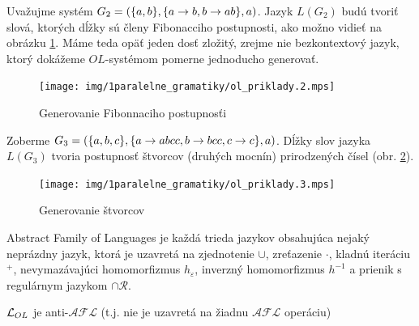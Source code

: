 \begin{priklad}
    Uvažujme systém $G_{2}=(\{a,b\},\{ a \rightarrow b, b \rightarrow ab \},a)$.
    Jazyk $L(G_{2})$ budú
    tvoriť slová, ktorých dĺžky sú členy Fibonacciho postupnosti, ako
    možno vidieť na obrázku \ref{img:ol_priklad_2}. Máme teda
    opäť jeden dosť zložitý, zrejme nie bezkontextový jazyk,
    ktorý dokážeme $OL$-systémom pomerne jednoducho generovať.
    \begin{figure}[htp]
        \centering
        \texttt{[image: img/1paralelne\_gramatiky/ol\_priklady.2.mps]}
        \caption{Generovanie Fibonnaciho postupnosťi}
        \label{img:ol_priklad_2}
    \end{figure}
\end{priklad}


\begin{priklad}
    Zoberme $G_3=(\{a,b,c\},\{a \rightarrow abcc,b \rightarrow bcc,
        c \rightarrow c\},a)$. Dĺžky
    slov jazyka $L(G_3)$ tvoria postupnosť štvorcov (druhých mocnín)
    prirodzených čísel (obr. \ref{img:ol_priklad_3}).

    \begin{figure}[htp]
        \centering
        \texttt{[image: img/1paralelne\_gramatiky/ol\_priklady.3.mps]}
        \caption{Generovanie štvorcov}
        \label{img:ol_priklad_3}
    \end{figure}
\end{priklad}


\begin{definicia}
    Abstract Family of Languages je každá trieda
    jazykov obsahujúca nejaký neprázdny jazyk, ktorá je uzavretá na
    zjednotenie $\cup$, zreťazenie $\cdot$, kladnú iteráciu $^+$,
    nevymazávajúci homomorfizmus $h_{\varepsilon}$,
    inverzný homomorfizmus $h^{-1}$ a prienik s regulárnym jazykom
    $\cap\mathcal{R}$.
\end{definicia}

\begin{veta}
    $\mathcal{L}_{OL}$ je anti-$\mathcal{AFL}$ (t.j. nie je uzavretá
    na žiadnu $\mathcal{AFL}$ operáciu)
\end{veta}

